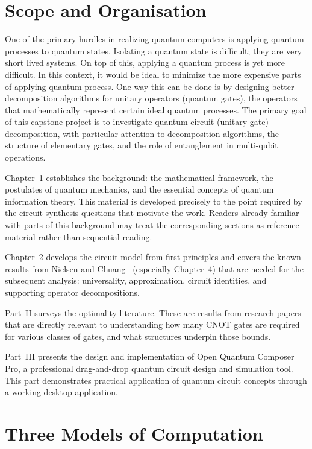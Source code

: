 \documentclass[12pt, a4paper, oneside]{report}
\theoremstyle{plain}
\theoremstyle{definition}
\theoremstyle{remark}
\begin{document}
\section{Scope and Organisation}

One of the primary hurdles in realizing quantum computers is applying quantum processes to quantum states. Isolating a quantum state is difficult; they are very short lived systems. On top of this, applying a quantum process is yet more difficult. In this context, it would be ideal to minimize the more expensive parts of applying  quantum process. One way this can be done is by designing better decomposition algorithms for unitary operators (quantum gates), the operators that mathematically represent certain ideal quantum processes. The primary goal of this capstone project is to investigate quantum circuit (unitary gate) decomposition,
with particular attention to decomposition algorithms, the structure of elementary gates, and
the role of entanglement in multi-qubit operations.

Chapter~1 establishes the background: the mathematical framework, the postulates of quantum
mechanics, and the essential concepts of quantum information theory. This material is
developed precisely to the point required by the circuit synthesis questions that motivate
the work. Readers already familiar with parts of this background may treat the corresponding
sections as reference material rather than sequential reading.

Chapter~2 develops the circuit model from first principles and covers the known results from
Nielsen and Chuang~\cite{nielsen2000} (especially Chapter~4) that are needed for the
subsequent analysis: universality, approximation, circuit identities, and supporting operator
decompositions.

Part~II surveys the optimality literature. These are results from research papers that are directly relevant to understanding how many CNOT gates are
required for various classes of gates, and what structures underpin those bounds.

Part~III presents the design and implementation of Open Quantum Composer Pro, a professional 
drag-and-drop quantum circuit design and simulation tool. This part demonstrates practical 
application of quantum circuit concepts through a working desktop application.

\section{Three Models of Computation}
\end{document}
